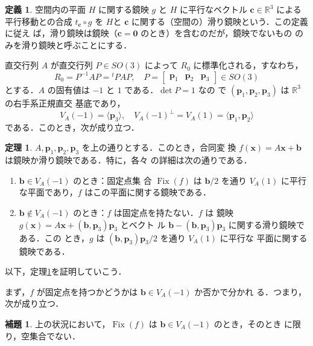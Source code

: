 \documentclass[11pt, uplatex, dvipdfmx, titlepage]{jsarticle}
\DeclareMathOperator{\Fix}{Fix}
\theoremstyle{definition}
\newtheorem{theorem}{定理}[section]
\newtheorem*{definition}{定義}
\newtheorem{lemma}{補題}[section]
\begin{document}
\begin{definition}
  空間内の平面 $H$ に関する鏡映 $g$ と $H$ に平行なベクトル $\bm{c}
  \in \mathbb{R}^3$ による平行移動との合成 $t_{\bm{c}} \circ
  g$ を $H$と $\bm{c}$ に関する（空間の）滑り鏡映という．この定義に従え
  ば，滑り鏡映は鏡映（$\bm{c}=\bm{0}$ のとき）を含むのだが，鏡映でないもの
  のみを滑り鏡映と呼ぶことにする．
\end{definition}


直交行列 $A$ が直交行列 $P \in SO(3)$ によって $R_{0}$ に標準化される，すなわち，
\[
  R_{0} = P^{-1}AP = {}^{t}PAP, \quad P=\left[
    \begin{array}{ccc}
      \bm{p}_1 & \bm{p}_2 & \bm{p}_3
    \end{array}
  \right] \in SO(3)
\]
とする．$A$ の固有値は $-1$ と $1$ である．$\det P=1$ なの
で $(\bm{p}_1, \bm{p}_2, \bm{p}_3)$ は $\mathbb{R}^3$ の右手系正規直交
基底であり，
\[
  V_A(-1) = \langle \bm{p}_3\rangle, \quad V_A(-1)^{\perp} = V_A(1)
  =\langle \bm{p}_1, \bm{p}_2 \rangle
\]
である．このとき，次が成り立つ．

\begin{theorem}\label{thm:RefOrGlide3}
  $A, \bm{p}_1, \bm{p}_2, \bm{p}_3$ を上の通りとする．このとき，合同変
  換 $f(\bm{x}) = A\bm{x} + \bm{b}$ は鏡映か滑り鏡映である．特に，各々
  の詳細は次の通りである．
  \begin{enumerate}[(1)]
  \item $\bm{b} \in V_A(-1)$ のとき：固定点集
    合 $\Fix(f)$ は $\bm{b}/2$ を通り $V_A(1)$ に平行な平面であり，$f$
    はこの平面に関する鏡映である．

  \item $\bm{b} \not\in V_A(-1)$ のとき：$f$ は固定点を持たない．$f$ は
    鏡映 $g(\bm{x})=A\bm{x} + (\bm{b},\bm{p}_3)\bm{p}_3$ とベクト
    ル $\bm{b}-(\bm{b},\bm{p}_3)\bm{p}_3$ に関する滑り鏡映である．この
    とき，$g$ は $(\bm{b},\bm{p}_3)\bm{p}_3/2$ を通り $V_A(1)$ に平行な
    平面に関する鏡映である．
  \end{enumerate}
\end{theorem}

以下，定理\ref{thm:RefOrGlide3}を証明していこう．

まず，$f$ が固定点を持つかどうかは $\bm{b} \in V_A(-1)$ か否かで分かれ
る．つまり，次が成り立つ．

\begin{lemma}\label{lem:RefOrGlide3}
  上の状況において，$\Fix(f)$ は $\bm{b} \in V_A(-1)$ のとき，そのとき
  に限り，空集合でない．
\end{lemma}
\end{document}
